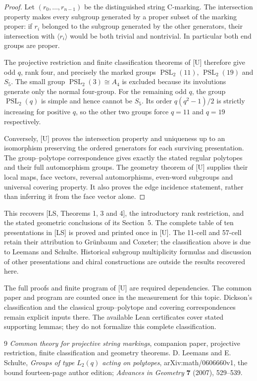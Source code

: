 \documentclass[11pt,a4paper]{article}
\begin{document}
\begin{proof}
Let $(r_0,\ldots,r_{n-1})$ be the distinguished string C-marking.
The intersection property makes every subgroup generated by a proper
subset of the marking proper: if $r_i$ belonged to the subgroup
generated by the other generators, their intersection with
$\langle r_i\rangle$ would be both trivial and nontrivial.
In particular both end groups are proper.

The projective restriction and finite classification theorems of [U]
therefore give odd $q$, rank four, and precisely the marked groups
$\operatorname{PSL}_2(11)$, $\operatorname{PSL}_2(19)$ and $S_5$.
The small group $\operatorname{PSL}_2(3)\cong A_4$ is excluded because
its involutions generate only the normal four-group. For the remaining
odd $q$, the group $\operatorname{PSL}_2(q)$ is simple and hence cannot
be $S_5$. Its order $q(q^2-1)/2$ is strictly increasing for positive
$q$, so the other two groups force $q=11$ and $q=19$ respectively.

Conversely, [U] proves the intersection property and uniqueness up to an
isomorphism preserving the ordered generators for each surviving presentation. The group--polytope
correspondence gives exactly the stated regular polytopes and their
full automorphism groups. The geometry theorem of [U] supplies their
local maps, face vectors, reversal automorphisms, even-word subgroups
and universal covering property. It also proves the edge incidence
statement, rather than inferring it from the face vector alone.
\end{proof}

This recovers [LS, Theorems 1, 3 and 4], the introductory rank
restriction, and the stated geometric conclusions of its Section~5. The complete table of ten presentations in [LS] is proved and
printed once in [U]. The 11-cell and 57-cell retain their attribution
to Gr\"unbaum and Coxeter; the classification above is due to Leemans
and Schulte. Historical subgroup multiplicity formulas and discussion
of other presentations and chiral constructions are outside the
results recovered here.

The full proofs and finite program of [U] are required dependencies.
The common paper and program are counted once in the measurement for this topic. Dickson's classification
and the classical group--polytope and covering correspondences remain
explicit inputs there. The available Lean certificates cover stated
supporting lemmas; they do not formalize this complete classification.

\begin{thebibliography}{9}
 \emph{Common theory for projective string markings},
companion paper, projective restriction, finite classification and
geometry theorems.
 D. Leemans and E. Schulte,
\emph{Groups of type $L_2(q)$ acting on polytopes},
arXiv:math/0606660v1, the bound fourteen-page author edition;
\emph{Advances in Geometry} \textbf{7} (2007), 529--539.
\end{thebibliography}
\end{document}
